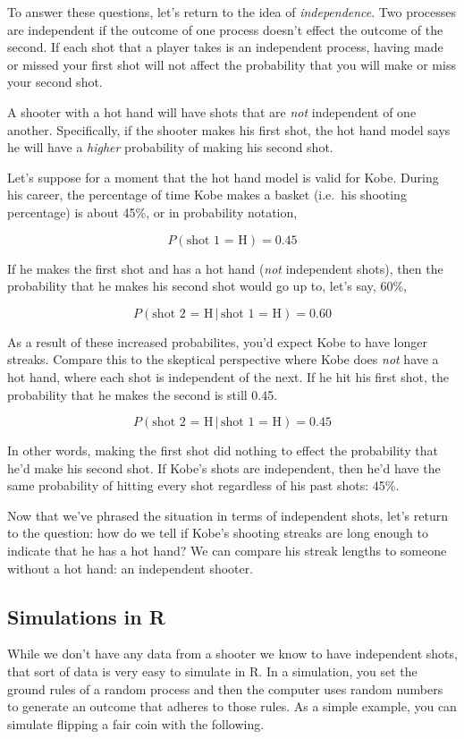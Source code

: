 \documentclass[
]{article}
\begin{document}
To answer these questions, let's return to the idea of
\emph{independence}. Two processes are independent if the outcome of one
process doesn't effect the outcome of the second. If each shot that a
player takes is an independent process, having made or missed your first
shot will not affect the probability that you will make or miss your
second shot.

A shooter with a hot hand will have shots that are \emph{not}
independent of one another. Specifically, if the shooter makes his first
shot, the hot hand model says he will have a \emph{higher} probability
of making his second shot.

Let's suppose for a moment that the hot hand model is valid for Kobe.
During his career, the percentage of time Kobe makes a basket (i.e.~his
shooting percentage) is about 45\%, or in probability notation,

\[ P(\textrm{shot 1 = H}) = 0.45 \]

If he makes the first shot and has a hot hand (\emph{not} independent
shots), then the probability that he makes his second shot would go up
to, let's say, 60\%,

\[ P(\textrm{shot 2 = H} \, | \, \textrm{shot 1 = H}) = 0.60 \]

As a result of these increased probabilites, you'd expect Kobe to have
longer streaks. Compare this to the skeptical perspective where Kobe
does \emph{not} have a hot hand, where each shot is independent of the
next. If he hit his first shot, the probability that he makes the second
is still 0.45.

\[ P(\textrm{shot 2 = H} \, | \, \textrm{shot 1 = H}) = 0.45 \]

In other words, making the first shot did nothing to effect the
probability that he'd make his second shot. If Kobe's shots are
independent, then he'd have the same probability of hitting every shot
regardless of his past shots: 45\%.

Now that we've phrased the situation in terms of independent shots,
let's return to the question: how do we tell if Kobe's shooting streaks
are long enough to indicate that he has a hot hand? We can compare his
streak lengths to someone without a hot hand: an independent shooter.

\subsection{Simulations in R}\label{simulations-in-r}

While we don't have any data from a shooter we know to have independent
shots, that sort of data is very easy to simulate in R. In a simulation,
you set the ground rules of a random process and then the computer uses
random numbers to generate an outcome that adheres to those rules. As a
simple example, you can simulate flipping a fair coin with the
following.
\end{document}
